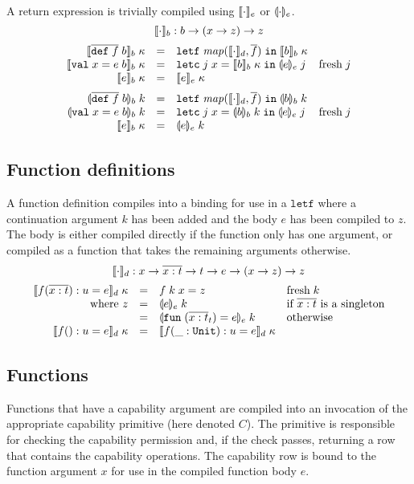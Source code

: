 \documentclass[11pt]{article}
\newcommand{\kw}[1]{\mathtt{#1}}
\begin{document}
A return expression is trivially compiled using $\llbracket \cdot \rrbracket_e$ or $\llparenthesis \cdot \rrparenthesis_e$.
\[
    \llbracket \cdot \rrbracket_b : b -> (x -> z) -> z
\]
\[
\begin{array}{rcll}
\cmpk{b}{\fundef{f}{b}} & = &
  \letff{\map{\cmpn{d}}{\repo{f}}}{\cmpk{b}{b}} \\
\cmpk{b}{\valdef{x}{e}{b}} & = &
  \letc{j}{x}{\cmpk{b}{b}}{\tcmpin{e}{e}{j}} & \fresh{j} \\
\cmpk{b}{\return{e}} & = &
  \cmpk{e}{e} \medskip \\

\tcmpk{b}{\fundef{f}{b}} & = &
  \letff{\map{\cmpn{d}}{\repo{f}}}{\tcmpk{b}{b}} \\
\tcmpk{b}{\valdef{x}{e}{b}} & = &
  \letc{j}{x}{\tcmpk{b}{b}}{\tcmpin{e}{e}{j}} & \fresh{j} \\
\cmpk{b}{\return{e}} & = &
  \tcmpk{e}{e} \\
\end{array}
\]

\subsection*{Function definitions}

A function definition compiles into a binding for use in a $\kw{letf}$ where a continuation argument $k$ has been added and the body $e$ has been compiled to $z$.
The body is either compiled directly if the function only has one argument, or compiled as a function that takes the remaining arguments otherwise.
\[
    \llbracket \cdot \rrbracket_d : x -> \overline{x : t} -> t -> e -> (x -> z) -> z
\]
\[
\begin{array}{rcll}
\cmpk{d}{\fdo{f}{x}{t}{u}{e}} & = &
  \defterm{f}{k}{x}{z} &
  \fresh{k} \\
\text{where $z$} & = &
  \tcmpk{e}{e} & \text{if $\repo{\arge{x}{t}}$ is a singleton} \\
 & = &
  \tcmpk{e}{\fune{\repo{\arge{x}{t}}_t}{e}} & \text{otherwise} \\
\cmpk{d}{\fde{f}{}{u}{e}} & = &
  \cmpk{d}{\fde{f}{\_ : \unity}{u}{e}}
\end{array}
\]

\subsection*{Functions}

Functions that have a capability argument are compiled into an invocation of the appropriate capability primitive (here denoted $C$).
The primitive is responsible for checking the capability permission and, if the check passes, returning a row that contains the capability operations.
The capability row is bound to the function argument $x$ for use in the compiled function body $e$.
\end{document}
